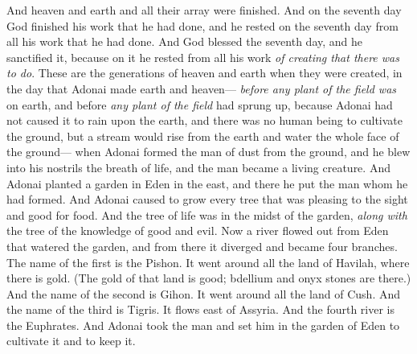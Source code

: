 \begin{biblechapter} %
\verse And heaven and earth and all their array were finished.
\verse And on the seventh day God finished his work that he had done, and he rested on the seventh day from all his work that he had done.
\verse And God blessed the seventh day, and he sanctified it, because on it he rested from all his work \textit{of creating that there was to do}.
 These are the generations of heaven and earth when they were created, in the day that Adonai made earth and heaven—
\verse \textit{before any plant of the field was} on earth, and before \textit{any plant of the field} had sprung up, because Adonai had not caused it to rain upon the earth, and there was no human being to cultivate the ground,
\verse but a stream would rise from the earth and water the whole face of the ground—
\verse when Adonai formed the man of dust from the ground, and he blew into his nostrils the breath of life, and the man became a living creature.
\verse And Adonai planted a garden in Eden in the east, and there he put the man whom he had formed.
\verse And Adonai caused to grow every tree that was pleasing to the sight and good for food. And the tree of life was in the midst of the garden, \textit{along with} the tree of the knowledge of good and evil.
\verse Now a river flowed out from Eden that watered the garden, and from there it diverged and became four branches.
\verse The name of the first is the Pishon. It went around all the land of Havilah, where there is gold.
\verse (The gold of that land is good; bdellium and onyx stones are there.)
\verse And the name of the second is Gihon. It went around all the land of Cush.
\verse And the name of the third is Tigris. It flows east of Assyria. And the fourth river is the Euphrates.
\verse And Adonai took the man and set him in the garden of Eden to cultivate it and to keep it.

\end{biblechapter}
